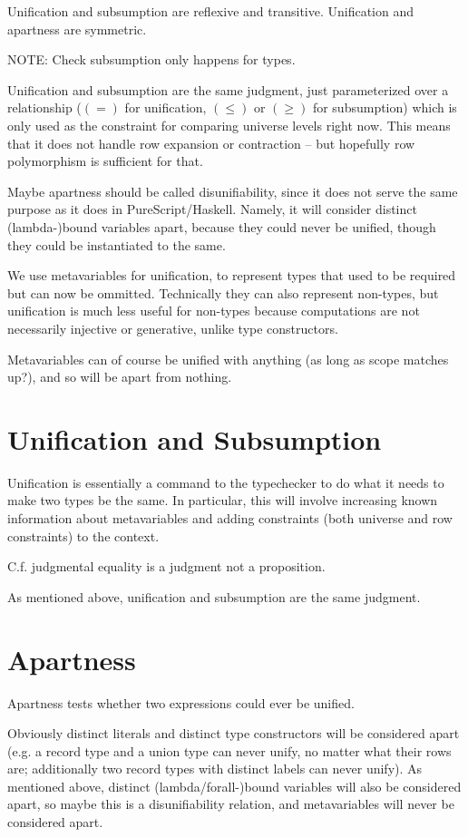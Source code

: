 \documentclass[11pt, twoside, reqno]{book}
\begin{document}
Unification and subsumption are reflexive and transitive.
Unification and apartness are symmetric.

NOTE: Check subsumption only happens for types.

Unification and subsumption are the same judgment, just parameterized over a relationship ($(=)$ for unification, \((\le)\) or \((\ge)\) for subsumption) which is only used as the constraint for comparing universe levels right now.
This means that it does not handle row expansion or contraction -- but hopefully row polymorphism is sufficient for that.

Maybe apartness should be called disunifiability, since it does not serve the same purpose as it does in PureScript/Haskell.
Namely, it will consider distinct (lambda-)bound variables apart, because they could never be unified, though they could be instantiated to the same.

We use metavariables for unification, to represent types that used to be required but can now be ommitted.
Technically they can also represent non-types, but unification is much less useful for non-types because computations are not necessarily injective or generative, unlike type constructors.

Metavariables can of course be unified with anything (as long as scope matches up?), and so will be apart from nothing.

\section{Unification and Subsumption}
Unification is essentially a command to the typechecker to do what it needs to make two types be the same.
In particular, this will involve increasing known information about metavariables and adding constraints (both universe and row constraints) to the context.

C.f. judgmental equality is a judgment not a proposition.

As mentioned above, unification and subsumption are the same judgment.



\section{Apartness}
Apartness tests whether two expressions could ever be unified.

Obviously distinct literals and distinct type constructors will be considered apart (e.g. a record type and a union type can never unify, no matter what their rows are; additionally two record types with distinct labels can never unify).
As mentioned above, distinct (lambda/forall-)bound variables will also be considered apart, so maybe this is a disunifiability relation, and metavariables will never be considered apart.
\end{document}
